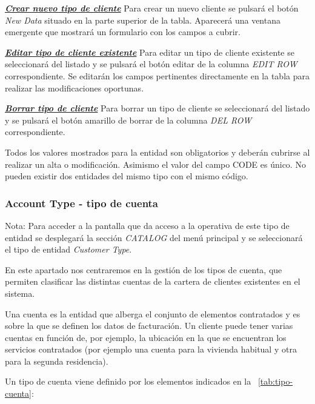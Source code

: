 \underline{\textsl{\textbf{Crear nuevo tipo de cliente}}}\newline
Para crear un nuevo cliente se pulsará el botón \textit{New Data} situado en la parte superior de la tabla. Aparecerá una ventana emergente que mostrará un formulario con los campos a cubrir.

\underline{\textsl{\textbf{Editar tipo de cliente existente}}}\newline
Para editar un tipo de cliente existente se seleccionará del listado y se pulsará el botón editar de la columna \textit{EDIT ROW} correspondiente. Se editarán los campos pertinentes directamente en la tabla para realizar las modificaciones oportunas. 

\underline{\textsl{\textbf{Borrar tipo de cliente}}}\newline
Para borrar un tipo de cliente se seleccionará del listado y se pulsará el botón amarillo de borrar de la columna \textit{DEL ROW} correspondiente.\newline

Todos los valores mostrados para la entidad son obligatorios y deberán cubrirse al realizar un alta o modificación. Asimismo el valor del campo CODE es único. No pueden existir dos entidades del mismo tipo con el mismo código.




\subsubsection{Account Type - tipo de cuenta}
\label{sub:account-type}

Nota: Para acceder a la pantalla que da acceso a la operativa de este tipo de entidad se desplegará la sección \emph{CATALOG} del menú principal y se seleccionará el tipo de entidad \emph{Customer Type}.

En este apartado nos centraremos en la gestión de los tipos de cuenta, que permiten clasificar las distintas cuentas de la cartera de clientes existentes en el sistema.

Una cuenta es la entidad que alberga el conjunto de elementos contratados y es sobre la que se definen los datos de facturación. Un cliente puede tener varias cuentas en función de, por ejemplo, la ubicación en la que se encuentran los servicios contratados (por ejemplo una cuenta para la vivienda habitual y otra para la segunda residencia). 


Un tipo de cuenta viene definido por los elementos indicados en la \tablename~\ref{tab:tipo-cuenta}:



